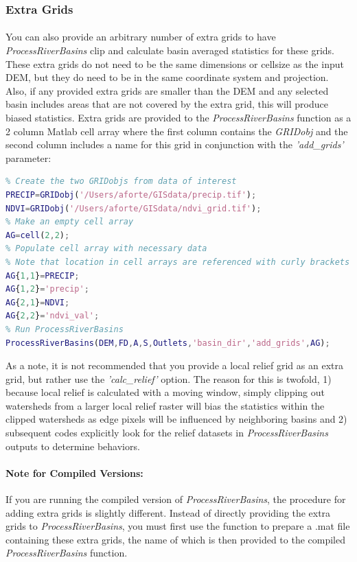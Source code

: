 \subsubsection{Extra Grids}
\paragraph{}You can also provide an arbitrary number of extra grids to have \textit{ProcessRiverBasins} clip and calculate basin averaged statistics for these grids. These extra grids do not need to be the same dimensions or cellsize as the input DEM, but they do need to be in the same coordinate system and projection. Also, if any provided extra grids are smaller than the DEM and any selected basin includes areas that are not covered by the extra grid, this will produce biased statistics. Extra grids are provided to the \textit{ProcessRiverBasins} function as a 2 column Matlab cell array where the first column contains the \textit{GRIDobj} and the second column includes a name for this grid in conjunction with the \textit{'add\_grids'} parameter:

\begin{lstlisting}[language=Matlab]
% To run ProcessRiverBasins and include two extra grids
% Create the two GRIDobjs from data of interest
PRECIP=GRIDobj('/Users/aforte/GISdata/precip.tif');
NDVI=GRIDobj('/Users/aforte/GISdata/ndvi_grid.tif');
% Make an empty cell array
AG=cell(2,2);
% Populate cell array with necessary data 
% Note that location in cell arrays are referenced with curly brackets
AG{1,1}=PRECIP;
AG{1,2}='precip';
AG{2,1}=NDVI;
AG{2,2}='ndvi_val';
% Run ProcessRiverBasins
ProcessRiverBasins(DEM,FD,A,S,Outlets,'basin_dir','add_grids',AG);
\end{lstlisting}

\noindent
As a note, it is not recommended that you provide a local relief grid as an extra grid, but rather use the \textit{'calc\_relief'} option. The reason for this is twofold, 1) because local relief is calculated with a moving window, simply clipping out watersheds from a larger local relief raster will bias the statistics within the clipped watersheds as edge pixels will be influenced by neighboring basins and 2) subsequent codes explicitly look for the relief datasets in \textit{ProcessRiverBasins} outputs to determine behaviors. 

\paragraph{Note for Compiled Versions:} If you are running the compiled version of \textit{ProcessRiverBasins}, the procedure for adding extra grids is slightly different. Instead of directly providing the extra grids to \textit{ProcessRiverBasins}, you must first use the  function to prepare a .mat file containing these extra grids, the name of which is then provided to the compiled \textit{ProcessRiverBasins} function.

